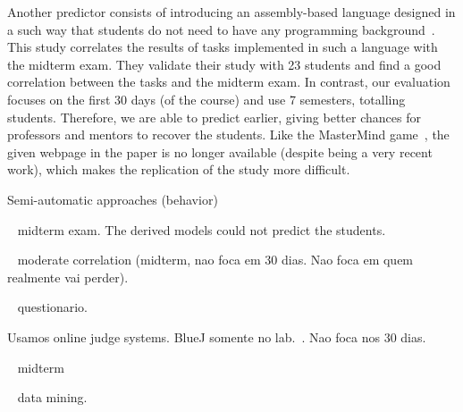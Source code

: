 Another predictor consists of introducing an assembly-based language designed in a such way that students do not need to have any programming background~\cite{harris-assembly-jcsc2014}. This study correlates the results of tasks implemented in such a language with the midterm exam. They validate their study with 23 students and find a good correlation between the tasks and the midterm exam. In contrast, our evaluation focuses on the first 30 days (\semesterPercentage of the course) and use 7 semesters, totalling \totalStudents students. Therefore, we are able to predict earlier, giving better chances for professors and mentors to recover the students. Like the MasterMind game~\cite{lorenzenC06-mastermind-predictor-sigcse2008}, the given webpage in the paper is no longer available (despite being a very recent work), which makes the replication of the study more difficult.

Semi-automatic approaches (behavior)~\cite{rodrigo-behavioral-ITiCSE2009}

~\cite{emily-icer-2011} midterm exam. The derived models could not predict the students.

~\cite{emily-up-2008} moderate correlation (midterm, nao foca em 30 dias. Nao foca em quem realmente vai perder).

~\cite{susan-sigce2005} questionario.

Usamos online judge systems. BlueJ somente no lab.~\cite{watson-icalt-2013}. Nao foca nos 30 dias.

~\cite{diane-acii-2011} midterm

~\cite{marques-ia-2013} data mining.


